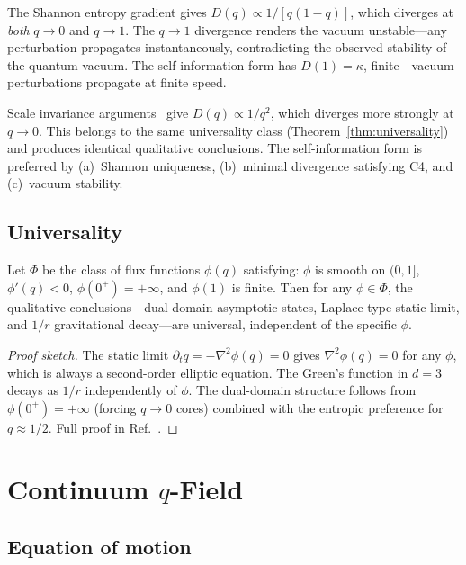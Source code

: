 \documentclass[reprint]{revtex4-2}
\begin{document}
The Shannon entropy gradient gives $D(q)\propto 1/[q(1-q)]$, which diverges at \emph{both} $q\to 0$ and $q\to 1$. The $q\to 1$ divergence renders the vacuum unstable---any perturbation propagates instantaneously, contradicting the observed stability of the quantum vacuum. The self-information form has $D(1)=\kappa$, finite---vacuum perturbations propagate at finite speed.

Scale invariance arguments~\cite{flux_derivation} give $D(q)\propto 1/q^2$, which diverges more strongly at $q\to 0$. This belongs to the same universality class (Theorem~\ref{thm:universality}) and produces identical qualitative conclusions. The self-information form is preferred by (a)~Shannon uniqueness, (b)~minimal divergence satisfying C4, and (c)~vacuum stability.

\subsection{Universality}

\begin{theorem}
\label{thm:universality}
Let $\Phi$ be the class of flux functions $\phi(q)$ satisfying: $\phi$ is smooth on $(0,1]$, $\phi'(q)<0$, $\phi(0^+)=+\infty$, and $\phi(1)$ is finite. Then for any $\phi\in\Phi$, the qualitative conclusions---dual-domain asymptotic states, Laplace-type static limit, and $1/r$ gravitational decay---are universal, independent of the specific $\phi$.
\end{theorem}
\begin{proof}[Proof sketch]
The static limit $\partial_t q = -\nabla^2\phi(q) = 0$ gives $\nabla^2\phi(q)=0$ for any $\phi$, which is always a second-order elliptic equation. The Green's function in $d=3$ decays as $1/r$ independently of $\phi$. The dual-domain structure follows from $\phi(0^+)=+\infty$ (forcing $q\to 0$ cores) combined with the entropic preference for $q\approx 1/2$. Full proof in Ref.~\cite{flux_universality}.
\end{proof}

\section{Continuum $q$-Field}

\subsection{Equation of motion}
\end{document}
